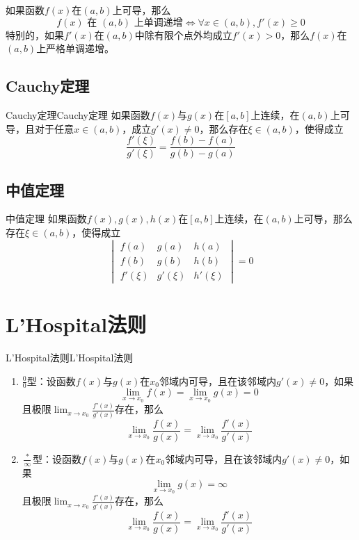 \documentclass[lang = cn, scheme = chinese, thmcnt = section]{elegantbook}
\begin{document}
\begin{theorem}
	如果函数$f(x)$在$(a,b)$上可导，那么
	$$
	f(x)\text{ 在 }(a,b)\text{ 上单调递增}
	\iff 
	\forall x\in (a,b),f'(x)\ge 0
	$$
	特别的，如果$f'(x)$在$(a,b)$中除有限个点外均成立$f'(x)>0$，那么$f(x)$在$(a,b)$上严格单调递增。
\end{theorem}

\subsection{Cauchy定理}

\begin{theorem}{Cauchy定理}{Cauchy定理}
	如果函数$f(x)$与$g(x)$在$[a,b]$上连续，在$(a,b)$上可导，且对于任意$x\in (a,b)$，成立$g'(x)\ne 0$，那么存在$\xi\in (a,b)$，使得成立
	$$
	\frac{f'(\xi)}{g'(\xi)}=\frac{f(b)-f(a)}{g(b)-g(a)}
	$$
\end{theorem}

\subsection{中值定理}

\begin{theorem}{中值定理}
	如果函数$f(x),g(x),h(x)$在$[a,b]$上连续，在$(a,b)$上可导，那么存在$\xi\in (a,b)$，使得成立
	$$
	\begin{vmatrix}
		f(a) & g(a) & h(a)\\
		f(b) & g(b) & h(b)\\
		f'(\xi) & g'(\xi) & h'(\xi)
	\end{vmatrix}=0
	$$
\end{theorem}

\section{L'Hospital法则}

\begin{theorem}{L'Hospital法则}{L'Hospital法则}
	\begin{enumerate}
		\item $\displaystyle\frac{0}{0}$型：设函数$f(x)$与$g(x)$在$x_0$邻域内可导，且在该邻域内$g'(x)\ne 0$，如果
		$$
		\lim_{x\to x_0} f(x)=\lim_{x\to x_0} g(x)=0
		$$
		且极限$\displaystyle\lim_{x\to x_0}\frac{f'(x)}{g'(x)}$存在，那么
		$$
		\lim_{x\to x_0}\frac{f(x)}{g(x)}=\lim_{x\to x_0}\frac{f'(x)}{g'(x)}
		$$
		\item $\displaystyle\frac{*}{\infty}$型：设函数$f(x)$与$g(x)$在$x_0$邻域内可导，且在该邻域内$g'(x)\ne 0$，如果
		$$
		\lim_{x\to x_0} g(x)=\infty
		$$
		且极限$\displaystyle\lim_{x\to x_0}\frac{f'(x)}{g'(x)}$存在，那么
		$$
		\lim_{x\to x_0}\frac{f(x)}{g(x)}=\lim_{x\to x_0}\frac{f'(x)}{g'(x)}
		$$
	\end{enumerate}
\end{theorem}
\end{document}
